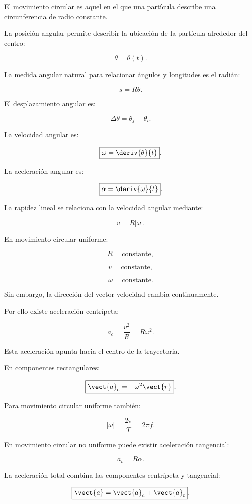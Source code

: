 \begin{resumen}

El movimiento circular es aquel en el que una partícula describe una
circunferencia de radio constante.

La posición angular permite describir la ubicación de la partícula alrededor
del centro:

\[
\theta=\theta(t).
\]

La medida angular natural para relacionar ángulos y longitudes es el radián:

\[
\boxed{s=R\theta}.
\]

El desplazamiento angular es:

\[
\boxed{
\Delta\theta=\theta_f-\theta_i
}.
\]

La velocidad angular es:

\[
\boxed{
\omega=\deriv{\theta}{t}
}.
\]

La aceleración angular es:

\[
\boxed{
\alpha=\deriv{\omega}{t}
}.
\]

La rapidez lineal se relaciona con la velocidad angular mediante:

\[
\boxed{
v=R|\omega|
}.
\]

En movimiento circular uniforme:

\[
R=\text{constante},
\]

\[
v=\text{constante},
\]

\[
\omega=\text{constante}.
\]

Sin embargo, la dirección del vector velocidad cambia continuamente.

Por ello existe aceleración centrípeta:

\[
\boxed{
a_c=\frac{v^2}{R}=R\omega^2
}.
\]

Esta aceleración apunta hacia el centro de la trayectoria.

En componentes rectangulares:

\[
\boxed{
\vect{a}_c=-\omega^2\vect{r}
}.
\]

Para movimiento circular uniforme también:

\[
\boxed{
|\omega|=\frac{2\pi}{T}=2\pi f
}.
\]

En movimiento circular no uniforme puede existir aceleración tangencial:

\[
\boxed{
a_t=R\alpha
}.
\]

La aceleración total combina las componentes centrípeta y tangencial:

\[
\boxed{
\vect{a}=\vect{a}_c+\vect{a}_t
}.
\]


\end{resumen}
